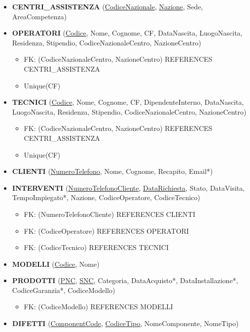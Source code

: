 \documentclass[a4paper, 12pt]{report}
\begin{document}
\begin{itemize}
	\item \textbf{CENTRI\_ASSISTENZA} (\underline{CodiceNazionale}, \underline{Nazione}, Sede, AreaCompetenza)
	\item \textbf{OPERATORI} (\underline{Codice}, Nome, Cognome, CF, DataNascita, LuogoNascita, Residenza, Stipendio, CodiceNazionaleCentro, NazioneCentro)
		\begin{itemize}[leftmargin=*, topsep=0pt]
			\item[] FK: (CodiceNazionaleCentro, NazioneCentro) REFERENCES CENTRI\_ASSISTENZA
			\item[] Unique(CF)
		\end{itemize}
	\item \textbf{TECNICI} (\underline{Codice}, Nome, Cognome, CF, DipendenteInterno, DataNascita, LuogoNascita, Residenza, Stipendio, CodiceNazionaleCentro, NazioneCentro)
		\begin{itemize}[leftmargin=*, topsep=0pt]
			\item[] FK: (CodiceNazionaleCentro, NazioneCentro) REFERENCES CENTRI\_ASSISTENZA
			\item[] Unique(CF)
		\end{itemize}
	\item \textbf{CLIENTI} (\underline{NumeroTelefono}, Nome, Cognome, Recapito, Email*)
	\item \textbf{INTERVENTI} (\underline{NumeroTelefonoCliente}, \underline{DataRichiesta}, Stato, DataVisita, TempoImpiegato*, Nazione, CodiceOperatore, CodiceTecnico)
		\begin{itemize}[leftmargin=*, topsep=0pt]
			\item[] FK: (NumeroTelefonoCliente) REFERENCES CLIENTI
			\item[] FK: (CodiceOperatore) REFERENCES OPERATORI
			\item[] FK: (CodiceTecnico) REFERENCES TECNICI
		\end{itemize}		
	\item \textbf{MODELLI} (\underline{Codice}, Nome)
	\item \textbf{PRODOTTI} (\underline{PNC}, \underline{SNC}, Categoria, DataAcquisto*, DataInstallazione*, CodiceGaranzia*, CodiceModello)
		\begin{itemize}[leftmargin=*, topsep=0pt]
			\item[] FK: (CodiceModello) REFERENCES MODELLI
		\end{itemize}		
	\item \textbf{DIFETTI} (\underline{ComponentCode}, \underline{CodiceTipo}, NomeComponente, NomeTipo)

\end{itemize}
\end{document}
